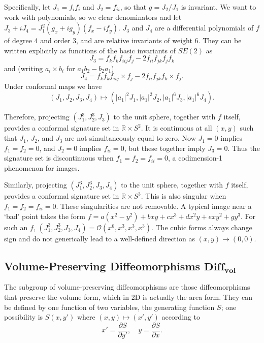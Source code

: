 \documentclass[review,onefignum,onetabnum]{siamonline190516}
\def\R{\mathbb{R}}
\begin{document}
{%

Specifically, let $J_1 = f_i f_i$ and  $J_2 = f_{ii}$, so that  $g = J_2/J_1$ is invariant.  We want to work with polynomials, so we clear denominators and let $J_3+iJ_4 = J_1^2 (g_x + i g_y)  (f_x - i f_y)$. $J_3$ and $J_4$ are a differential polynomials of $f$ of degree 4 and order 3, and are relative invariants of weight 6. They can be written explicitly as functions of the basic invariants of $SE(2)$ as
$$J_3 = f_k f_k f_{iij}f_j - 2 f_{ii} f_{jk} f_j f_k$$
and (writing $a_i\times b_i$ for $a_1 b_2 - b_2 a_1$)
$$ J_4 = f_k f_k f_{iij}\times f_j - 2 f_{ii} f_{jk} f_k\times f_j.$$
Under conformal maps we have
$$ (J_1,J_2,J_3,J_4) \mapsto (|a_1|^2 J_1, |a_1|^2 J_2, |a_1|^6 J_3,|a_1|^6 J_4).$$

Therefore, projecting $(J_1^3,J_2^3,J_3)$ to the unit sphere, together with $f$ itself, provides a conformal signature set in $\R\times S^2$. It is continuous at all $(x,y)$ such that $J_1$, $J_2$, and $J_3$ are not simultaneously equal to zero.  Now $J_1=0$ implies $f_1=f_2=0$, and $J_2=0$ implies $f_{ii}=0$, but these together imply $J_3=0$. Thus the signature set is discontinuous when $f_1=f_2=f_{ii}=0$, a codimension-1 phenomenon for images.

Similarly, projecting $(J_1^3,J_2^3,J_3,J_4)$ to the unit sphere, together with $f$ itself, provides a conformal signature set in $\R\times S^3$. This is also singular when $f_1=f_2=f_{ii}=0$. These singularities are not removable. A typical image near a `bad' point takes the form $f = a(x^2-y^2) + b x y + c x^3 + d x^2 y + e x y^2 + g y^3$.  For such an $f$, $(J_1^3,J_2^3,J_3,J_4)=\mathcal{O}(x^6,x^3,x^3,x^3)$.  The cubic forms always change sign and do not generically lead to a well-defined direction as $(x,y)\to(0,0)$. 

\subsection{Volume-Preserving Diffeomorphisms $\mathbf{Diff_{vol}}$}

The subgroup of volume-preserving diffeomorphisms are those diffeomorphisms that preserve the volume form, which in 2D is actually the area form. They can be defined by one function of two variables, the generating function $S$; one possibility is $S(x,y')$ where $(x,y)\mapsto(x',y')$ according to
$$ x'=\frac{\partial S}{\partial y'},\quad y = \frac{\partial S}{\partial x}.$$

}
\end{document}

